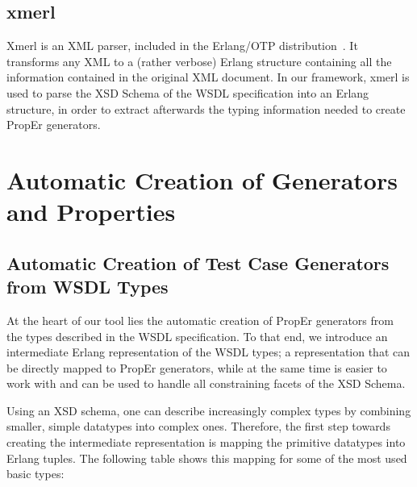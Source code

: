 \documentclass[submission,copyright]{eptcs}
\begin{document}
\subsection{xmerl}

Xmerl is an XML parser, included in the Erlang/OTP distribution~\cite{xmerl}.
It transforms any XML to a (rather verbose) Erlang structure containing all the 
information contained in the original XML document. In our framework, xmerl is 
used to parse the XSD Schema of the WSDL specification into an Erlang structure, in 
order to extract afterwards the typing information needed to create PropEr generators.

\section{Automatic Creation of Generators and Properties} \label{sec:automatic}

\subsection{Automatic Creation of Test Case Generators from WSDL Types}

At the heart of our tool lies the automatic creation of PropEr generators from 
the types described in the WSDL specification. To that end, we introduce an 
intermediate Erlang representation of the WSDL types; a representation that can 
be directly mapped to PropEr generators, while at the same time is easier to work 
with and can be used to handle all constraining facets of the XSD Schema. 

Using an XSD schema, one can describe increasingly complex types by combining
smaller, simple datatypes into complex ones. Therefore, the first step towards 
creating the intermediate representation is mapping the primitive datatypes 
into Erlang tuples. The following table shows this mapping for some of the
most used basic types:
\end{document}
